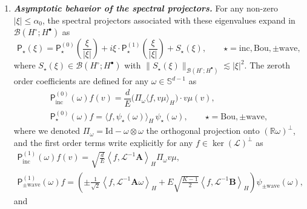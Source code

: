 \documentclass[AHL,Unicode,longabstracts,published]{cedram}
\newcommand{\Id}{\mathrm{Id}}
\newcommand{\Wave}{\mathrm{wave}}
\newcommand{\Inc}{\mathrm{inc}}
\newcommand{\Bou}{\mathrm{Bou}}
\newcommand{\BurA}{{\mathbf{A}}}
\newcommand{\BurB}{{\mathbf{B}}}
\newcommand{\R}{\mathbb{R}}
\renewcommand{\S}{\mathbb{S}}
\newcommand{\LL}{\mathcal{L}}
\newcommand{\PP}{\mathsf{P}}
\newcommand{\BBB}{\mathscr{B}}
\newcommand{\Ss}{H}
\newcommand{\Ssp}{H^{\bullet}}
\newcommand{\Ssm}{H^{\circ}}
\renewcommand*\le{\leqslant}
\newcommand{\la}{\langle}
\newcommand{\ra}{\rangle}
\begin{document}
\begin{theo}
\begin{enumerate}
\begin{itemize}
\begin{equation}\label{eq:burnett}
\begin{split}
\begin{cases}
\BurA (v) & := \displaystyle \sqrt{ \frac{d}{E} } \left(v \otimes v - \frac{|v|^2}{d} \Id \right) \mu(v),\\
\\
\BurB (v) & := \displaystyle \frac{1}{\sqrt{K (K-1)}} v \left(K - \frac{|v|^2}{E} \right) \mu(v).
\end{cases}
\end{split}
\end{equation}
\end{itemize}
\item\label{theo1.8.2} \textit{\textbf{Asymptotic behavior of the spectral projectors.}} For any non-zero $| \xi | \le \alpha_0$, the spectral projectors associated with these eigenvalues expand in $\BBB\left(\Ssm ; \Ssp \right)$ as
\begin{equation}\label{eq:PPstar}
\PP_\star(\xi) = \PP^{(0)}_\star\left(\frac{\xi}{|\xi|} \right) + i \xi \cdot \PP^{(1)}_\star\left(\frac{\xi}{|\xi|} \right) + S_{\star}(\xi), \qquad \star=\Inc,\Bou,\pm\Wave,
\end{equation}
where $S_{\star}(\xi) \in \BBB(\Ssm;\Ssp)$ with $\|S_{\star}(\xi)\|_{\BBB(\Ssm;\Ssp)} \lesssim | \xi |^2$. The zeroth order coefficients are defined for any $\omega \in \S^{d-1}$ as
\begin{gather*}
\PP_\Inc^{(0)}\left(\omega \right) f(v)=\dfrac{d}{E} \big(\Pi_\omega \langle f, v \mu \rangle_{\Ss}\big) \cdot v \mu(v),\\
\PP_\star^{(0)}(\omega)f = \big\langle f, \psi_\star(\omega) \big\rangle_{\Ss} \, \psi_\star(\omega), \qquad \star = \Bou, \pm \Wave,
\end{gather*}
where we denoted $\Pi_\omega=\Id - \omega \otimes \omega$ the orthogonal projection onto $(\R \omega)^\perp$, and the first order terms write explicitly for any $f \in \ker(\LL)^\perp$ as
\begin{gather*}
\PP^{(1)}_\Inc(\omega) f(v) = \sqrt{\frac{d}{E}} \left\la f, \LL^{-1}\BurA \right\ra_{\Ss} \Pi_\omega v \mu,\\
\PP^{(1)}_{\pm \Wave}(\omega) f = \left(\pm \frac{1}{\sqrt{2} } \left\langle f, \LL^{-1}\BurA \omega \right\rangle_{\Ss} + E \sqrt{\frac{K-1}{2}} \left\langle f, \LL^{-1} \BurB \right\rangle_{\Ss} \right) \psi_{\pm \Wave}(\omega),
\end{gather*}
and
\begin{equation}\label{eq:P_1_Bou}

\end{equation}
\end{enumerate}
\end{theo}
\end{document}
